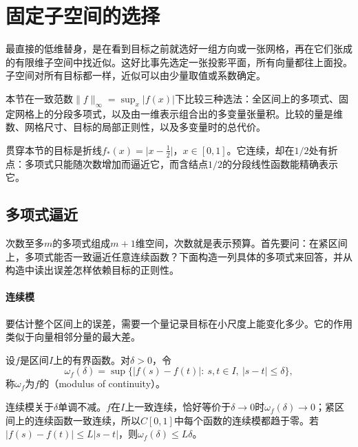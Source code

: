 \section{固定子空间的选择}
\label{sec:fapprox-fixed-subspaces}

最直接的低维替身，是在看到目标之前就选好一组方向或一张网格，再在它们张成的有限维子空间中找近似。这好比事先选定一张投影平面，所有向量都往上面投。子空间对所有目标都一样，近似可以由少量取值或系数确定。

本节在一致范数$\lVert f\rVert_\infty=\sup_x\lvert f(x)\rvert$下比较三种选法：全区间上的多项式、固定网格上的分段多项式，以及由一维表示组合出的多变量张量积。比较的量是维数、网格尺寸、目标的局部正则性，以及多变量时的总代价。

贯穿本节的目标是折线$f_*(x)=\lvert x-\frac12\rvert$，$x\in[0,1]$。它连续，却在$1/2$处有折点：多项式只能随次数增加而逼近它，而含结点$1/2$的分段线性函数能精确表示它。

\subsection{多项式逼近}
\label{sec:fapprox-polynomial}

次数至多$m$的多项式组成$m+1$维空间，次数就是表示预算。首先要问：在紧区间上，多项式能否一致逼近任意连续函数？下面构造一列具体的多项式来回答，并从构造中读出误差怎样依赖目标的正则性。

\paragraph{连续模}
要估计整个区间上的误差，需要一个量记录目标在小尺度上能变化多少。它的作用类似于向量相邻分量的最大差。

\begin{definition}[连续模]
\label{def:fapprox-modulus}
设$f$是区间$I$上的有界函数。对$\delta>0$，令
\begin{equation}
 \omega_f(\delta)=\sup\bigl\{\lvert f(s)-f(t)\rvert:\ s,t\in I,\ \lvert s-t\rvert\leq\delta\bigr\},
 \label{eq:fapprox-modulus}
\end{equation}
称$\omega_f$为$f$的（modulus of continuity）。
\end{definition}

连续模关于$\delta$单调不减。$f$在$I$上一致连续，恰好等价于$\delta\to0$时$\omega_f(\delta)\to0$；紧区间上的连续函数一致连续，所以$C[0,1]$中每个函数的连续模都趋于零。若$\lvert f(s)-f(t)\rvert\leq L\lvert s-t\rvert$，则$\omega_f(\delta)\leq L\delta$。

